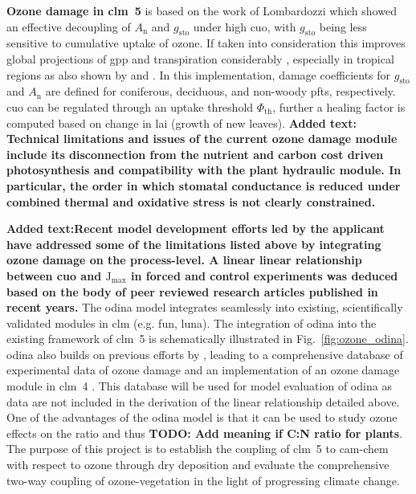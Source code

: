 \textbf{Ozone damage in \gls{clm}~5} is based on the work of Lombardozzi \textcite{Oe:Lombardozzi2012} which showed an effective decoupling of $A_\mathrm{n}$ and $g_\mathrm{sto}$ under high \gls{cuo}, with $g_\mathrm{sto}$ being less sensitive to cumulative uptake of ozone. If taken into consideration this improves global projections of \gls{gpp} and transpiration considerably \parencite{BGS:Lombardozzi2012}, especially in tropical regions as also shown by \textcite{Nat:Sitch2007} and \textcite{ACP:Pacifico2015}. In this implementation, damage coefficients for $g_\mathrm{sto}$ and $A_\mathrm{n}$ are defined for coniferous, deciduous, and non-woody \glspl{pft}, respectively. \gls{cuo} can be regulated through an uptake threshold $\Phi_\mathrm{th}$, further a healing factor is computed based on change in \gls{lai} (growth of new leaves). \textbf{Added text: Technical limitations and issues of the current ozone damage module include its disconnection from the nutrient and carbon cost driven photosynthesis and compatibility with the plant hydraulic module. In particular, the order in which stomatal conductance is reduced under combined thermal and oxidative stress is not clearly constrained.} 

\textbf{Added text:Recent model development efforts led by the applicant have addressed some of the limitations listed above by integrating ozone damage on the process-level. A linear linear relationship between \gls{cuo} and $\mathrm{J_{max}}$ in forced and control experiments was deduced based on the body of peer reviewed research articles published in recent years.} The \gls{odina} model integrates seamlessly into existing, scientifically validated modules in \gls{clm} (e.g. \gls{fun}, \gls{luna}). The integration of \gls{odina} into the existing framework of \gls{clm}~5 is schematically illustrated in Fig.~\ref{fig:ozone_odina}. \gls{odina} also builds on previous efforts by \textcites{BGS:Lombardozzi2012}{Oe:Lombardozzi2012}, leading to a comprehensive database of experimental data of ozone damage and an implementation of an ozone damage module in \gls{clm}~4 \parencite{BGS:Lombardozzi2013}. This database will be used for model evaluation of \gls{odina} as data are not included in the derivation of the linear relationship detailed above. One of the advantages of the \gls{odina} model is that it can be used to study ozone effects on the  ratio and thus \textbf{TODO: Add meaning if C:N ratio for plants}. The purpose of this project is to establish the coupling of \gls{clm}~5 to \gls{cam}-chem with respect to ozone through dry deposition and evaluate the comprehensive two-way coupling of ozone-vegetation in the light of progressing climate change.
